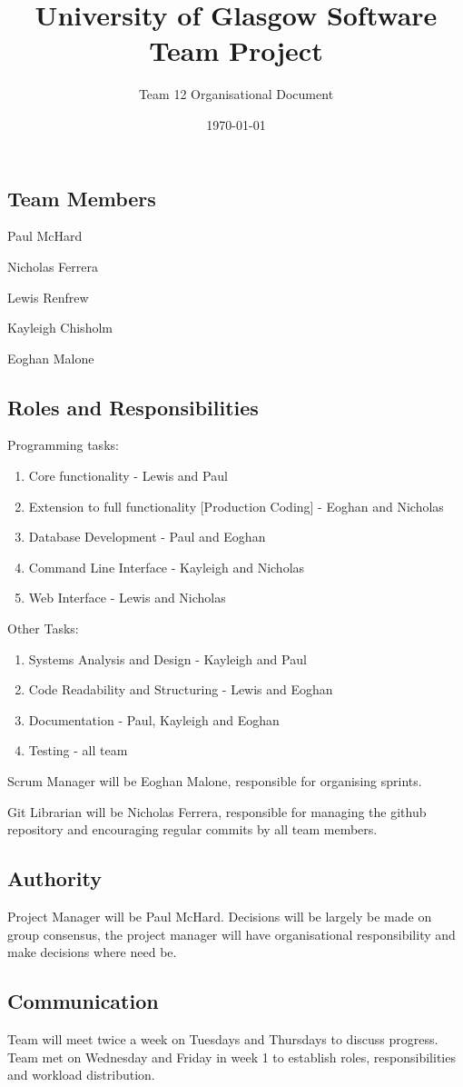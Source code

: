 \documentclass[11pt]{article}
\title{University of Glasgow Software Team Project}
\author{Team 12 Organisational Document}
\date{\today}
\begin{document}
\maketitle
\subsection*{Team Members}
Paul McHard

Nicholas Ferrera

Lewis Renfrew

Kayleigh Chisholm

Eoghan Malone
\subsection*{Roles and Responsibilities}
Programming tasks:
\begin{enumerate}
\item Core functionality - Lewis and Paul
\item Extension to full functionality [Production Coding] - Eoghan and Nicholas
\item Database Development - Paul and Eoghan
\item Command Line Interface - Kayleigh and Nicholas
\item Web Interface  - Lewis and Nicholas
\end{enumerate}
Other Tasks:
\begin{enumerate}
\item Systems Analysis and Design - Kayleigh and Paul
\item Code Readability and Structuring - Lewis and Eoghan
\item Documentation - Paul, Kayleigh and Eoghan
\item Testing - all team
\end{enumerate}

Scrum Manager will be Eoghan Malone, responsible for organising sprints.

Git Librarian will be Nicholas Ferrera, responsible for managing the github repository and encouraging regular commits by all team members.


\subsection*{Authority}
Project Manager will be Paul McHard. Decisions will be largely be made on group consensus, the project manager will have organisational responsibility and make decisions where need be.
\subsection*{Communication}
Team will meet twice a week on Tuesdays and Thursdays to discuss progress. Team met on Wednesday and Friday in week 1 to establish roles, responsibilities and workload distribution. 
\end{document}
